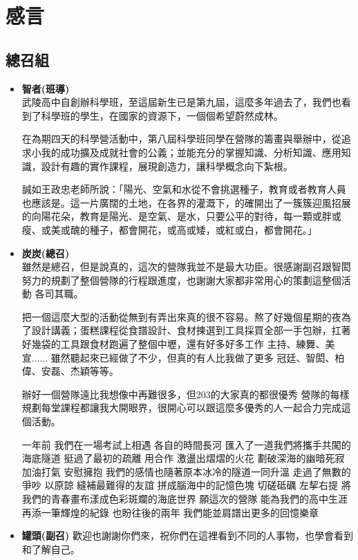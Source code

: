 \chapter{感言}
\section{總召組}
\begin{itemize}
\item \textbf{智者(班導)} \\
武陵高中自創辦科學班，至這屆新生已是第九屆，這麼多年過去了，我們也看到了科學班的學生，在國家的資源下，一個個希望蔚然成林。

在為期四天的科學營活動中，第八屆科學班同學在營隊的籌畫與舉辦中，從追求小我的成功擴及成就社會的公義；並能充分的掌握知識、分析知識、應用知識，設計有趣的實作課程，展現創造力，讓科學概念向下紮根。

誠如王政忠老師所說：「陽光、空氣和水從不會挑選種子，教育或者教育人員也應該是。這一片廣闊的土地，在各界的灌溉下，的確開出了一簇簇迎風招展的向陽花朵，教育是陽光、是空氣、是水，只要公平的對待，每一顆或胖或瘦、或美或醜的種子，都會開花，或高或矮，或紅或白，都會開花。」

\item \textbf{炭炭(總召)} \\
雖然是總召，但是說真的，這次的營隊我並不是最大功臣。很感謝副召跟智閎努力的規劃了整個營隊的行程跟進度，也謝謝大家都非常用心的策劃這整個活動 各司其職。

把一個這麼大型的活動從無到有弄出來真的很不容易。熬了好幾個星期的夜為了設計講義；蛋糕課程從食譜設計、食材揀選到工具採買全部一手包辦，扛著好幾袋的工具跟食材跑遍了整個中壢，還有好多好多工作  主持、練舞、美宣......
雖然聽起來已經做了不少，但真的有人比我做了更多 冠廷、智閎、柏偉、安磊、杰穎等等。

辦好一個營隊遠比我想像中再難很多，但203的大家真的都很優秀
營隊的每樣規劃每堂課程都讓我大開眼界，很開心可以跟這麼多優秀的人一起合力完成這個活動。

一年前 我們在一場考試上相遇
各自的時間長河 匯入了一道我們將攜手共闖的海底隧道
挺過了最初的疏離 用合作 激盪出熠熠的火花 劃破深海的幽暗死寂
加油打氣 安慰擁抱 我們的感情也隨著原本冰冷的隧道一同升溫
走過了無數的爭吵 以原諒 縫補最難得的友誼 拼成腦海中的記憶色塊
切磋砥礪 左挈右提 將我們的青春畫布漾成色彩斑斕的海底世界
願這次的營隊 能為我們的高中生涯再添一筆輝煌的紀錄
也盼往後的兩年 我們能並肩譜出更多的回憶樂章

\item \textbf{罐頭(副召)}
歡迎也謝謝你們來，祝你們在這裡看到不同的人事物，也學會看到和了解自己。
\end{itemize}

